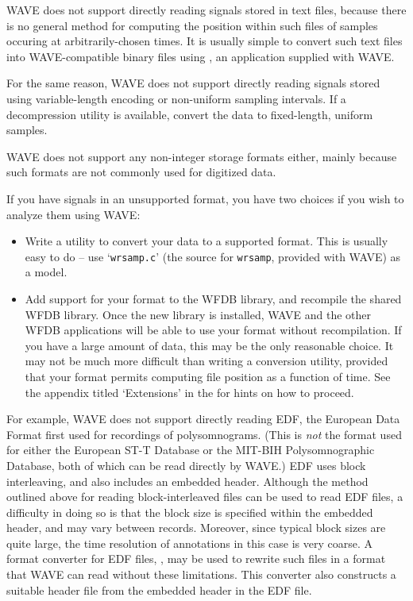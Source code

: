 \documentclass[twoside]{book}
\newcommand{\WAVE}{{\sf WAVE}\xspace}
\begin{document}
\WAVE{} does not support directly reading signals stored in text files, because
there is no general method for computing the position within such files of
samples occuring at arbitrarily-chosen times.  It is usually simple to convert
such text files into \WAVE{}-compatible binary files using
,
an application supplied with \WAVE{}.

For the same reason, \WAVE{} does not support directly reading signals stored
using variable-length encoding or non-uniform sampling intervals.  If a
decompression utility is available, convert the data to fixed-length, uniform
samples.

\WAVE{} does not support any non-integer storage formats either, mainly because
such formats are not commonly used for digitized data.

If you have signals in an unsupported format, you have two choices if you wish
to analyze them using \WAVE{}:

\begin{itemize}

\item
Write a utility to convert your data to a supported format.  This is usually
easy to do -- use `{\tt wrsamp.c}' (the source for {\tt wrsamp}, provided with
\WAVE{}) as a model.

\item
Add support for your format to the WFDB library, and recompile the shared WFDB
library.  Once the new library is installed, \WAVE{} and the other WFDB
applications will be able to use your format without recompilation.
If you have a large amount of data, this may be the only reasonable choice.
It may not be much more difficult than writing a conversion utility,
provided that your format permits computing file position as a function of
time.  See the appendix titled `{\sf Extensions}' in the 
for hints on how to proceed.
\end{itemize}

For example, \WAVE{} does not support directly reading EDF, the
European Data Format first used for recordings of
polysomnograms. (This is \emph{not} the format used for either the
European ST-T Database or the MIT-BIH Polysomnographic Database, both
of which can be read directly by \WAVE{}.)  EDF uses block
interleaving, and also includes an embedded header.  Although the
method outlined above for reading block-interleaved files can
be used to read EDF files, a difficulty in doing so is that the block
size is specified within the embedded header, and may vary between
records.  Moreover, since typical block sizes are quite large, the
time resolution of annotations in this case is very coarse.  A format
converter for EDF files,
, may be
used to rewrite such files in a format that \WAVE{} can read without
these limitations.  This converter also constructs a
suitable header file from the embedded header in the EDF file.
\end{document}
